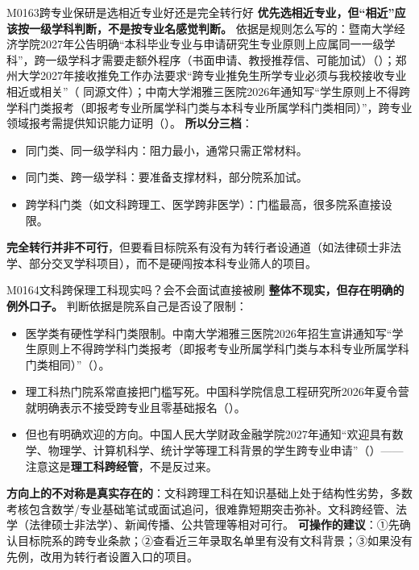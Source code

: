 \begin{qa}{M0163}{跨专业保研是选相近专业好还是完全转行好}
\textbf{优先选相近专业，但“相近”应该按一级学科判断，不是按专业名感觉判断。}
依据是规则怎么写的：暨南大学经济学院2027年公告明确“本科毕业专业与申请研究生专业原则上应属同一一级学科”，跨一级学科才需要走额外程序（书面申请、教授推荐信、可能加试）（）；郑州大学2027年接收推免工作办法要求“跨专业推免生所学专业必须与我校接收专业相近或相关”（ 同源文件）；中南大学湘雅三医院2026年通知写“学生原则上不得跨学科门类报考（即报考专业所属学科门类与本科专业所属学科门类相同）”，跨专业领域报考需提供知识能力证明（）。
\textbf{所以分三档}：
\begin{itemize}
  \item 同门类、同一级学科内：阻力最小，通常只需正常材料。
  \item 同门类、跨一级学科：要准备支撑材料，部分院系加试。
  \item 跨学科门类（如文科跨理工、医学跨非医学）：门槛最高，很多院系直接设限。
\end{itemize}
\textbf{完全转行并非不可行}，但要看目标院系有没有为转行者设通道（如法律硕士非法学、部分交叉学科项目），而不是硬闯按本科专业筛人的项目。
\end{qa}

\begin{qa}{M0164}{文科跨保理工科现实吗？会不会面试直接被刷}
\textbf{整体不现实，但存在明确的例外口子。} 判断依据是院系自己是否设了限制：
\begin{itemize}
  \item 医学类有硬性学科门类限制。中南大学湘雅三医院2026年招生宣讲通知写“学生原则上不得跨学科门类报考（即报考专业所属学科门类与本科专业所属学科门类相同）”（）。
  \item 理工科热门院系常直接把门槛写死。中国科学院信息工程研究所2026年夏令营就明确表示不接受跨专业且零基础报名（）。
  \item 但也有明确欢迎的方向。中国人民大学财政金融学院2027年通知“欢迎具有数学、物理学、计算机科学、统计学等理工科背景的学生跨专业申请”（）——注意这是\textbf{理工科跨经管}，不是反过来。
\end{itemize}
\textbf{方向上的不对称是真实存在的}：文科跨理工科在知识基础上处于结构性劣势，多数考核包含数学/专业基础笔试或面试追问，很难靠短期突击弥补。文科跨经管、法学（法律硕士非法学）、新闻传播、公共管理等相对可行。
\textbf{可操作的建议}：①先确认目标院系的跨专业条款；②查看近三年录取名单里有没有文科背景；③如果没有先例，改用为转行者设置入口的项目。
\end{qa}

